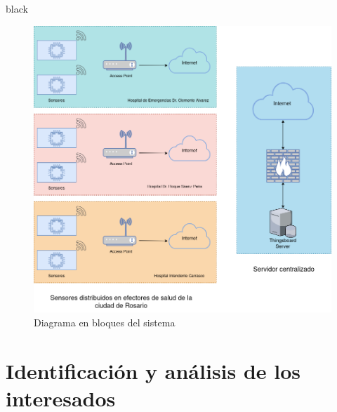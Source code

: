 \documentclass[11pt]{charter}
\begin{document}
\begin{consigna}{black}
\begin{figure}[htpb]
\centering 
\includegraphics[width=.7\textwidth]{./Figuras/bloquesgral.png}
\caption{Diagrama en bloques del sistema}
\label{fig:diagBloques}
\end{figure}

\vspace{25px}

\end{consigna}


\section{Identificación y análisis de los interesados}
\label{sec:interesados}
\end{document}
